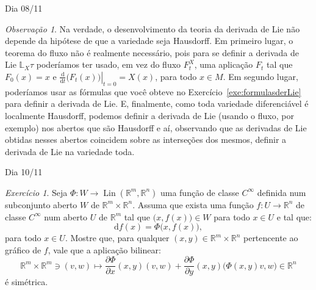 \documentclass[oneside,11pt]{amsart}
\newcommand{\R}{\mathds R}
\newcommand{\dd}{\mathrm d}
\DeclareMathOperator{\Lin}{Lin}
\theoremstyle{remark}\newtheorem{exercise}{Exercício}[section]
\theoremstyle{plain}\newtheorem{teo}{Teorema}[section]
\theoremstyle{plain}\newtheorem{lem}[teo]{Lema}
\theoremstyle{plain}\newtheorem{prop}[teo]{Proposição}
\theoremstyle{definition}\newtheorem{defin}[teo]{Definição}
\theoremstyle{remark}\newtheorem{rem}[teo]{Observação}
\theoremstyle{definition}\newtheorem{example}[teo]{Exemplo}
\numberwithin{equation}{section}
\begin{document}
\begin{section}{Dia 08/11}
\noindent{}\hbox{\dbend}\hspace{10pt}\parbox[t]{330pt}{\begin{rem}
Na verdade, o desenvolvimento da teoria da derivada de Lie não depende da hipótese de que a variedade seja Hausdorff. Em primeiro lugar, o teorema
do fluxo não é realmente necessário, pois para se definir a derivada de Lie $\mathbb L_X\tau$ poderíamos ter usado, em vez do fluxo $F^X_t$, uma aplicação
$F_t$ tal que $F_0(x)=x$ e $\left.\frac{\dd}{\dd t}\big(F_t(x)\big)\right\vert_{t=0}=X(x)$, para todo $x\in M$. Em segundo lugar, poderíamos usar as
fórmulas que você obteve no Exercício~\ref{exe:formulasderLie} para definir a derivada de Lie. E, finalmente, como toda variedade diferenciável é localmente Hausdorff, podemos
definir a derivada de Lie (usando o fluxo, por exemplo) nos abertos que são Hausdorff e aí, observando que as derivadas de Lie obtidas nesses abertos
coincidem sobre as interseções dos mesmos, definir a derivada de Lie na variedade toda.
\end{rem}}

\end{section}

\begin{section}{Dia 10/11}

\begin{exercise}
Seja $\Phi:W\to\Lin(\R^m,\R^n)$ uma função de classe $C^\infty$ definida num subconjunto aberto $W$ de $\R^m\times\R^n$. Assuma que exista uma função
$f:U\to\R^n$ de classe $C^\infty$ num aberto $U$ de $\R^m$ tal que $\big(x,f(x)\big)\in W$ para todo $x\in U$ e tal que:
\[\dd f(x)=\Phi\big(x,f(x)\big),\]
para todo $x\in U$. Mostre que, para qualquer $(x,y)\in\R^m\times\R^n$ pertencente ao gráfico de $f$, vale que a aplicação bilinear:
\[\R^m\times\R^m\ni(v,w)\longmapsto\frac{\partial\Phi}{\partial x}(x,y)(v,w)+\frac{\partial\Phi}{\partial y}(x,y)\big(\Phi(x,y)v,w\big)\in\R^n\]
é simétrica.
\end{exercise}

\end{section}

\appendix
\end{document}
